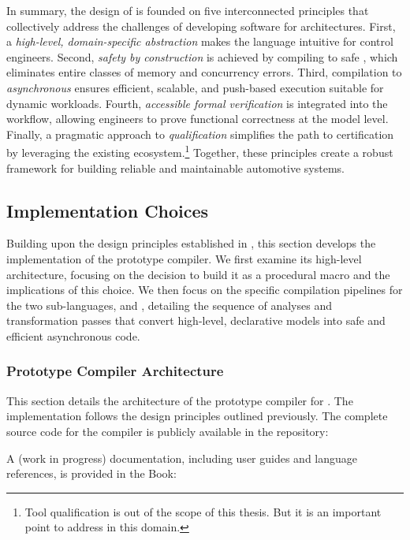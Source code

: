 In summary, the design of \GRust is founded on five interconnected principles that collectively
address the challenges of developing software for \sdv architectures. First, a \emph{high-level,
    domain-specific abstraction} makes the language intuitive for control engineers. Second,
\emph{safety by construction} is achieved by compiling to safe \Rust, which eliminates entire
classes of memory and concurrency errors. Third, compilation to \emph{asynchronous \Rust} ensures
efficient, scalable, and push-based execution suitable for dynamic workloads. Fourth,
\emph{accessible formal verification} is integrated into the workflow, allowing engineers to prove
functional correctness at the model level. Finally, a pragmatic approach to \emph{qualification}
simplifies the path to certification by leveraging the existing \Rust ecosystem.\footnote{Tool
    qualification is out of the scope of this thesis. But it is an important point to address in
    this domain.} Together, these principles create a robust framework for building reliable and
maintainable automotive systems.

\subsection{Implementation Choices}
\label{sec:grust:implem:choices}

Building upon the design principles established in , this
section develops the implementation of the \GRust prototype compiler. We first examine its
high-level architecture, focusing on the decision to build it as a \Rust procedural macro and the
implications of this choice. We then focus on the specific compilation pipelines for the two
sub-languages, \GRSync and \GRFRP, detailing the sequence of analyses and transformation passes that
convert high-level, declarative models into safe and efficient asynchronous \Rust code.

\subsubsection{Prototype Compiler Architecture}
\label{sec:grust:implem:choices:architecture}

This section details the architecture of the prototype compiler for \GRust. The implementation
follows the design principles outlined previously. The complete source code for the compiler is
publicly available in the \GRust repository:
\begin{center}
    \URLgrust
\end{center}
A (work in progress) documentation, including user guides and language references, is provided in
the \GRust Book:
\begin{center}
    \URLgrbook
\end{center}

